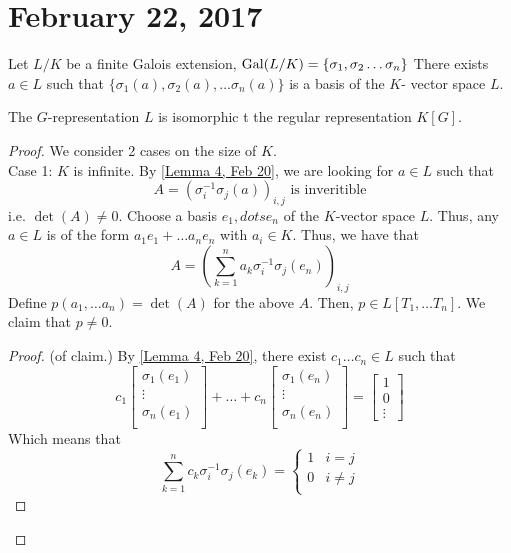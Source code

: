 \section{February 22, 2017} %
\begin{thm} \label{Thm 1, Feb 22}
    Let $L / K$ be a finite Galois extension, $\gal(L/K) = \{\sigma_1, \sigma_2 \dots \sigma_n\}$
    There exists $a \in L$ such that $\{\sigma_1(a), \sigma_2(a), \dots \sigma_n(a) \}$
    is a basis of the $K$- vector space $L$.
\end{thm}
\begin{rmk}
    The $G$-representation $L$ is isomorphic t the regular representation $K[G]$.
\end{rmk}
\begin{proof}
We consider 2 cases on the size of $K$. \\
Case 1: $K$ is infinite. By \ref{Lemma 4, Feb 20}, we are looking for $a \in L$ such that
$$
A = (\sigma_i^{-1}\sigma_j(a))_{i,j} \textrm{ is inveritible}
$$
i.e. $\det(A) \neq 0$. Choose a basis $e_1, dots e_n$ of the $K$-vector space $L$.
Thus, any $a \in L$ is of the form $a_1e_1 + \dots a_ne_n$ with $a_i \in K$.
Thus, we have that
$$
A = \left(\sum_{k=1}^{n}{a_k\sigma_i^{-1}\sigma_j(e_n)}\right)_{i,j}
$$
Define $p(a_1, \dots a_n) = \det(A)$ for the above $A$. Then, $p \in L[T_1, \dots T_n]$.
We claim that $p \neq 0$.
\begin{proof}
    (of claim.) By \ref{Lemma 4, Feb 20}, there exist $c_1 \dots c_n \in L$ such
    that
    $$
    c_1\begin{bmatrix} \sigma_1(e_1) \\ \vdots \\ \sigma_n(e_1) \\ \end{bmatrix}
    + \dots
    +c_n\begin{bmatrix} \sigma_1(e_n) \\ \vdots \\ \sigma_n(e_n) \\ \end{bmatrix}
    =
    \begin{bmatrix} 1 \\ 0 \\ \vdots \end{bmatrix}
    $$
    Which means that
    $$
    \sum_{k=1}^{n}{c_k\sigma_i^{-1}\sigma_j(e_k)} =
    \begin{cases}
      1 & i = j\\
      0 &  i \neq j \\

\end{cases}$$
\end{proof}
\end{proof}
